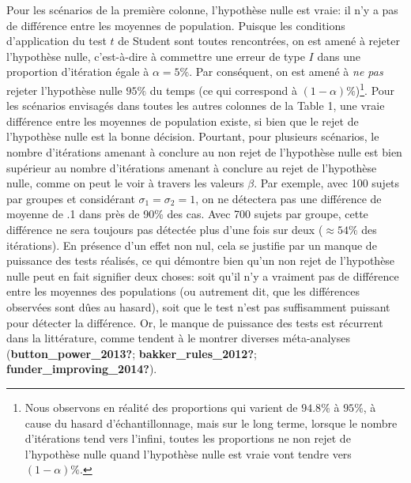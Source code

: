 \documentclass[
  english,
  man]{apa6}
\begin{document}
Pour les scénarios de la première colonne, l'hypothèse nulle est vraie: il n'y a pas de différence entre les moyennes de population. Puisque les conditions d'application du test \(t\) de Student sont toutes rencontrées, on est amené à rejeter l'hypothèse nulle, c'est-à-dire à commettre une erreur de type \(I\) dans une proportion d'itération égale à \(\alpha = 5\%\). Par conséquent, on est amené à \emph{ne pas} rejeter l'hypothèse nulle \(95\%\) du temps (ce qui correspond à \((1-\alpha)\%\))\footnote{Nous observons en réalité des proportions qui varient de $94.8\%$ à $95\%$, à cause du hasard d'échantillonnage, mais sur le long terme, lorsque le nombre d'itérations tend vers l'infini, toutes les proportions ne non rejet de l'hypothèse nulle quand l'hypothèse nulle est vraie vont tendre vers $(1-\alpha) \%$.}. Pour les scénarios envisagés dans toutes les autres colonnes de la Table 1, une vraie différence entre les moyennes de population existe, si bien que le rejet de l'hypothèse nulle est la bonne décision. Pourtant, pour plusieurs scénarios, le nombre d'itérations amenant à conclure au non rejet de l'hypothèse nulle est bien supérieur au nombre d'itérations amenant à conclure au rejet de l'hypothèse nulle, comme on peut le voir à travers les valeurs \(\beta\). Par exemple, avec 100 sujets par groupes et considérant \(\sigma_1=\sigma_2=1\), on ne détectera pas une différence de moyenne de .1 dans près de 90\% des cas. Avec 700 sujets par groupe, cette différence ne sera toujours pas détectée plus d'une fois sur deux (\(\approx 54 \%\) des itérations). En présence d'un effet non nul, cela se justifie par un manque de puissance des tests réalisés, ce qui démontre bien qu'un non rejet de l'hypothèse nulle peut en fait signifier deux choses: soit qu'il n'y a vraiment pas de différence entre les moyennes des populations (ou autrement dit, que les différences observées sont dûes au hasard), soit que le test n'est pas suffisamment puissant pour détecter la différence. Or, le manque de puissance des tests est récurrent dans la littérature, comme tendent à le montrer diverses méta-analyses (\textbf{button\_power\_2013?}; \textbf{bakker\_rules\_2012?}; \textbf{funder\_improving\_2014?}).
\end{document}
